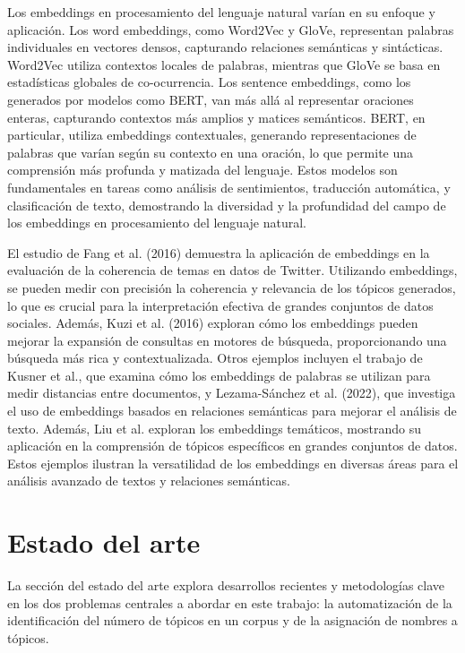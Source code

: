 Los embeddings en procesamiento del lenguaje natural varían en su enfoque y aplicación. Los word embeddings, como Word2Vec y GloVe, representan palabras individuales en vectores densos, capturando relaciones semánticas y sintácticas. Word2Vec utiliza contextos locales de palabras, mientras que GloVe se basa en estadísticas globales de co-ocurrencia. Los sentence embeddings, como los generados por modelos como BERT, van más allá al representar oraciones enteras, capturando contextos más amplios y matices semánticos. BERT, en particular, utiliza embeddings contextuales, generando representaciones de palabras que varían según su contexto en una oración, lo que permite una comprensión más profunda y matizada del lenguaje. Estos modelos son fundamentales en tareas como análisis de sentimientos, traducción automática, y clasificación de texto, demostrando la diversidad y la profundidad del campo de los embeddings en procesamiento del lenguaje natural.

El estudio de Fang et al. (2016) demuestra la aplicación de embeddings en la evaluación de la coherencia de temas en datos de Twitter. Utilizando embeddings, se pueden medir con precisión la coherencia y relevancia de los tópicos generados, lo que es crucial para la interpretación efectiva de grandes conjuntos de datos sociales. Además, Kuzi et al. (2016) exploran cómo los embeddings pueden mejorar la expansión de consultas en motores de búsqueda, proporcionando una búsqueda más rica y contextualizada. Otros ejemplos incluyen el trabajo de Kusner et al., que examina cómo los embeddings de palabras se utilizan para medir distancias entre documentos, y Lezama-Sánchez et al. (2022), que investiga el uso de embeddings basados en relaciones semánticas para mejorar el análisis de texto. Además, Liu et al. exploran los embeddings temáticos, mostrando su aplicación en la comprensión de tópicos específicos en grandes conjuntos de datos. Estos ejemplos ilustran la versatilidad de los embeddings en diversas áreas para el análisis avanzado de textos y relaciones semánticas.

\section{Estado del arte}

La sección del estado del arte explora desarrollos recientes y metodologías clave en los dos problemas centrales a abordar en este trabajo: la automatizaci\'on de la identificación del número de tópicos en un corpus y de la asignaci\'on de nombres a t\'opicos. 

